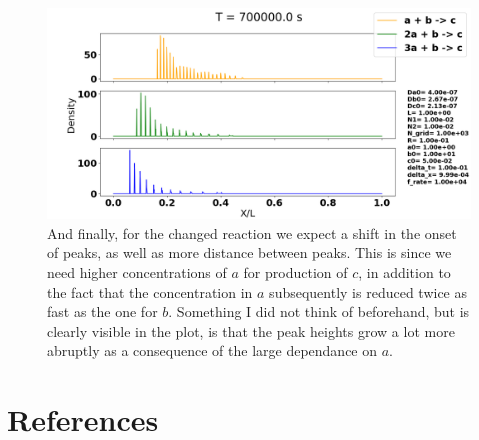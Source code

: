 \documentclass[1p]{elsarticle}        	%
\begin{document}
\begin{figure}
	\centering
	\includegraphics[width=\linewidth]{../figures/2a_s.png}
	\caption{And finally, for the changed reaction we expect a shift in the onset of peaks, as well as more distance between peaks. This is since we need higher concentrations of $a$ for production of $c$, in addition to the fact that the concentration in $a$ subsequently is reduced twice as fast as the one for $b$. Something I did not think of beforehand, but is clearly visible in the plot, is that the peak heights grow a lot more abruptly as a consequence of the large dependance on $a$.}
	\label{fig:coords}
\end{figure}






\section*{References}

  
\end{document}

